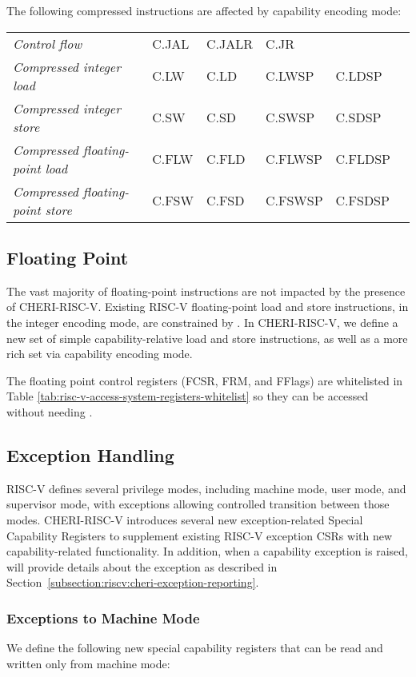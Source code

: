 The following compressed instructions are affected by capability encoding
mode:

\medskip

\begin{tabular}{llllll}
\textit{Control flow} & C.JAL & C.JALR & C.JR & \\
\textit{Compressed integer load} & C.LW & C.LD & C.LWSP & C.LDSP & \\
\textit{Compressed integer store} & C.SW & C.SD & C.SWSP & C.SDSP & \\
\textit{Compressed floating-point load} & C.FLW & C.FLD & C.FLWSP & C.FLDSP & \\
\textit{Compressed floating-point store} & C.FSW & C.FSD & C.FSWSP & C.FSDSP & \\
\end{tabular}

\subsection{Floating Point}

The vast majority of floating-point instructions are not impacted by the
presence of CHERI-RISC-V.
Existing RISC-V floating-point load and store instructions, in the
integer encoding mode, are constrained by \DDC{}.
In CHERI-RISC-V, we define a new set of simple capability-relative load and
store instructions, as well as a more rich set via capability encoding mode.

The floating point control
registers (FCSR, FRM, and FFlags) are whitelisted in Table \ref{tab:risc-v-access-system-registers-whitelist}
so they can be accessed without needing \cappermASR{}.

\subsection{Exception Handling}
\label{subsection:riscv:exceptionhandling}
RISC-V defines several privilege modes, including machine mode, user mode, and
supervisor mode, with exceptions allowing controlled transition between those modes.
CHERI-RISC-V introduces several new exception-related Special Capability Registers
to supplement existing RISC-V exception CSRs with new capability-related functionality.
In addition, when a capability exception is raised, \xtval{} will provide
details about the exception as described in Section~\ref{subsection:riscv:cheri-exception-reporting}.

\subsubsection{Exceptions to Machine Mode}
We define the following new special capability registers that can be read and
written only from machine mode:

